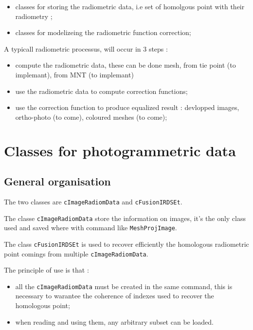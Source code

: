 \begin{itemize}
   \item  classes for storing the radiometric data,  i.e set of homolgous point
	   with their radiometry ;

   \item  classes for modelizeing the radiometric function correction;
\end{itemize}

A typicall radiometric processus, will occur in $3$ steps :

\begin{itemize}
	\item  compute the radiometric data, these can be done mesh, from tie point (to implemant),
		from  MNT (to implemant)
        \item   use the radiometric data to compute correction functions;
	\item   use the correction function to produce equalized result : devlopped images,
                ortho-photo (to come), coloured meshes (to come);
\end{itemize}


\section{Classes for photogrammetric data}

\subsection{General organisation}

The two classes are {\tt cImageRadiomData} and {\tt cFusionIRDSEt}.

The classe {\tt cImageRadiomData}  store the information on images,
it's the only class used and saved where with command like {\tt MeshProjImage}.

The class {\tt cFusionIRDSEt} is used to recover efficiently the 
homologous radiometric point comings from multiple {\tt cImageRadiomData}.

The principle of use is that :

\begin{itemize} 
   \item all the  {\tt cImageRadiomData} must be created in the same command,
         this is necessary to warantee the coherence  of indexes used to recover the homologous point;

   \item when reading and using them, any arbitrary subset can be loaded.
\end{itemize}



